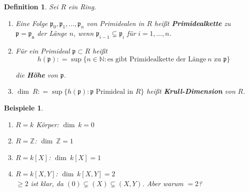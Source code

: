 \documentclass[a4paper,12pt]{scrbook}
\theoremstyle{break}
\newtheorem{Def}{Definition}[chapter]
\theoremstyle{nonumberbreak}
\newtheorem{nnBsp}{Beispiele}
\theoremstyle{nonumberplain}
\newcommand{\emp}[1]{\textbf{\emph{#1}}}
\newcommand{\defeqr}[0]{\mathrel{\mathop:}=}
\begin{document}
\begin{Def}
\label{2.24}
Sei $R$ ein Ring. 
\begin{enumerate}

\item Eine Folge $\mathfrak{p}_0, \mathfrak{p}_1, \dots ,\mathfrak{p}_n$
von Primidealen in $R$ heißt \emp{Primidealkette} zu $\mathfrak{p}=\mathfrak{p_n}$
der Länge $n$, wenn $\mathfrak{p}_{i-1}\subsetneq \mathfrak{p}_i$ für $i=1,\ldots, n$.

\item Für ein Primideal $\mathfrak{p}\subset R$ heißt
$$ h(\mathfrak{p}) \defeqr \sup\{n\in\mathbb{N}: \text{es gibt Primidealkette der Länge}\ n \text{ zu } \mathfrak{p}\} $$

die \emp{Höhe} von $\mathfrak{p}$.

\item $\dim\ R\defeqr\sup\{h(\mathfrak{p}) : \mathfrak{p} \text{ Primideal in } R\}$
heißt \emp{Krull-Dimension} von $R$.

\end{enumerate}
\end{Def}


\begin{nnBsp}
\begin{enumerate}
\item $R=k$ Körper: $\dim\ k=0$
\item $R=\mathbb{Z}$: $\dim\ \mathbb{Z}=1$
\item $R=k[X]$: $\dim\ k[X] =1$
\item $R=k[X,Y]$: $\dim\ k[X,Y] =2$\\
$\geq 2$ ist klar, da $(0)\subsetneq(X)\subsetneq(X,Y)$. Aber warum $=2$?
\end{enumerate}
\end{nnBsp}
\end{document}

